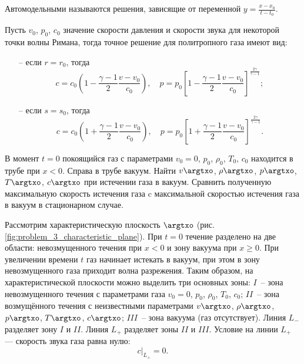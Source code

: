 \documentclass[14pt]{extarticle}
\begin{document}
\begin{dfn}
\alert{Автомодельными} называются решения, зависящие от переменной $y=\displaystyle\frac{x-x_0}{t-t_0}$.
\end{dfn}

Пусть $v_0$, $p_0$, $c_0$ значение скорости давления и скорости звука для некоторой точки волны Римана, тогда точное решение для политропного газа имеют вид:
\begin{itemize}
\item[--]
	если $r = r_0$, тогда 
	\begin{equation}
		\label{eq:solution_r_wave}
		c=c_0\left(
		1 - \frac{\gamma-1}{2}\frac{v-v_0}{c_0}
		\right),\quad
		p = p_0 \left[
		1 - \frac{\gamma-1}{2} \frac{v-v_0}{c_0}
		\right]^{\frac{2\gamma}{\gamma-1}};
	\end{equation}
\item[--] если $s = s_0$, тогда
	\begin{equation}
		\label{eq:solution_l_wave}
		c=c_0\left(
		1 + \frac{\gamma-1}{2}\frac{v-v_0}{c_0}
		\right),\quad
		p = p_0 \left[
		1 + \frac{\gamma-1}{2} \frac{v-v_0}{c_0}
		\right]^{\frac{2\gamma}{\gamma-1}}.
	\end{equation}
\end{itemize}

\begin{problem}
В момент $t=0$  покоящийся газ с параметрами $v_0 = 0$, $p_0$, $\rho_0$, $T_0$, $c_0$ находится в трубе при $x<0$. Справа в трубе вакуум. Найти $v\argtxo$, $\rho\argtxo$, $p\argtxo$, $T\argtxo$, $c\argtxo$ при истечении газа в вакуум. Сравнить полученную максимальную скорость истечения газа c максимальной скоростью истечения газа в вакуум в стационарном случае.
\end{problem}

Рассмотрим характеристическую плоскость $\argtxo$ (рис. \ref{fig:problem_3_characteristic_plane}). При $t=0$ течение разделено на две области: невозмущенного течения при $x < 0$ и зону вакуума при $ x \geq 0$.
При увеличении времени $t$ газ начинает истекать в вакуум, при этом в зону невозмущенного газа приходит волна разрежения. Таким образом, на характеристической плоскости можно выделить три основных зоны: $I$~-- зона невозмущенного течения с параметрами газа $v_0 = 0$, $p_0$, $\rho_0$, $T_0$, $c_0$; $II$~-- зона возмущённого течения с неизвестными параметрами $v\argtxo$, $\rho\argtxo$, $p\argtxo$, $T\argtxo$, $c\argtxo$; $III$~-- зона вакуума (газ отсутствует). Линия $L_-$ разделяет зону $I$ и $II$. Линия $L_+$ разделяет зоны $II$ и $III$. Условие на линии $L_+$ --- скорость звука газа равна нулю:
\[
c|_{L_+}=0.
\]
\end{document}
